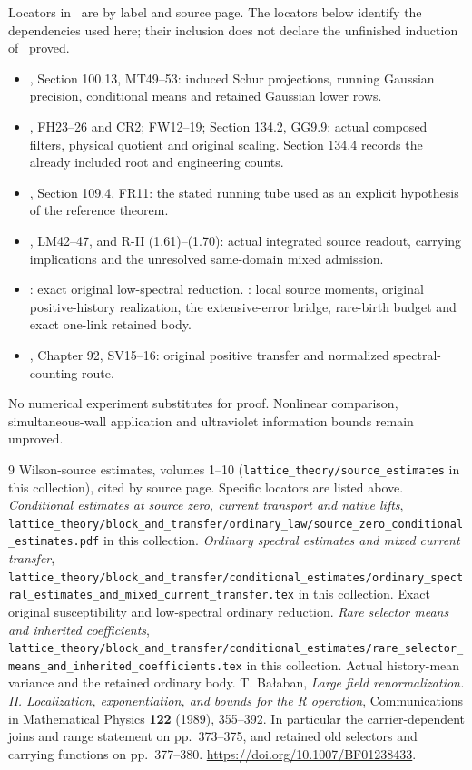 \documentclass[11pt,letterpaper]{article}
\theoremstyle{remark}\newtheorem{remark}[theorem]{Remark}
\begin{document}
Locators in~\cite{W} are by label and source page. The locators below identify the dependencies used here; their inclusion does not declare the unfinished induction of~\cite{W} proved.
\begin{itemize}
\item \cite[pp.~697--698]{W}, Section 100.13, MT49--53: induced Schur projections, running Gaussian precision, conditional means and retained Gaussian lower rows.
\item \cite[pp.~323--325, 383--384, 412--414, 1022--1024]{W}, FH23--26 and CR2; FW12--19; Section 134.2, GG9.9: actual composed filters, physical quotient and original scaling. Section 134.4 records the already included root and engineering counts.
\item \cite[p.~797]{W}, Section 109.4, FR11: the stated running tube used as an explicit hypothesis of the reference theorem.
\item \cite[pp.~781--783]{W}, LM42--47, and R-II (1.61)--(1.70): actual integrated source readout, carrying implications and the unresolved same-domain mixed admission.
\item \cite{OS}: exact original low-spectral reduction. \cite{RS}: local source moments, original positive-history realization, the extensive-error bridge, rare-birth budget and exact one-link retained body.
\item \cite[pp.~630--634]{W}, Chapter 92, SV15--16: original positive transfer and normalized spectral-counting route.
\end{itemize}
No numerical experiment substitutes for proof. Nonlinear comparison, simultaneous-wall application and ultraviolet information bounds remain unproved.
\endgroup

\begingroup\small\setlength{\parskip}{2pt}
\begin{thebibliography}{9}
 Wilson-source estimates, volumes 1--10 (\texttt{lattice\_theory/source\_estimates} in this collection), cited by source page. Specific locators are listed above.
 \emph{Conditional estimates at source zero, current transport and native lifts}, \texttt{lattice\_theory/block\_and\_transfer/ordinary\_law/source\_zero\_conditional\_estimates.pdf} in this collection.
 \emph{Ordinary spectral estimates and mixed current transfer}, \texttt{lattice\_theory/block\_and\_transfer/conditional\_estimates/ordinary\_spectral\_estimates\_and\_mixed\_current\_transfer.tex} in this collection. Exact original susceptibility and low-spectral ordinary reduction.
 \emph{Rare selector means and inherited coefficients}, \texttt{lattice\_theory/block\_and\_transfer/conditional\_estimates/rare\_selector\_means\_and\_inherited\_coefficients.tex} in this collection. Actual history-mean variance and the retained ordinary body.
 T. Ba\l aban, \emph{Large field renormalization. II. Localization, exponentiation, and bounds for the R operation}, Communications in Mathematical Physics \textbf{122} (1989), 355--392. In particular the carrier-dependent joins and range statement on pp.\ 373--375, and retained old selectors and carrying functions on pp.\ 377--380. \url{https://doi.org/10.1007/BF01238433}.
\end{thebibliography}
\endgroup
\end{document}
